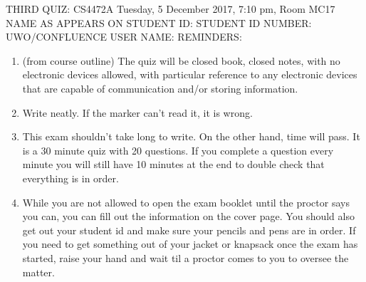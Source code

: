\documentclass{exam}
\begin{document}
THIRD QUIZ: CS4472A Tuesday, 5 December 2017, 7:10 pm, Room MC17\newline
\newline
\newline
\newline
NAME AS APPEARS ON STUDENT ID:\newline
\newline
STUDENT ID NUMBER:\newline
\newline
UWO/CONFLUENCE USER NAME:\newline
\newline
REMINDERS:
\begin{enumerate}
\item (from course outline) The quiz will be closed book, closed notes, with no electronic devices allowed, with particular reference to any electronic devices that are capable of communication and/or storing information.
\item Write neatly.  If the marker can't read it, it is wrong.
\item This exam shouldn't take long to write.  On the other hand, time will pass.  It is a 30 minute quiz with 20 questions.  If you complete a question every  minute you will still have 10 minutes at the end to double check that everything is in order.
\item While you are not allowed to open the exam booklet until the proctor says you can, you can fill out the information on the cover page.  You should also get out your student id and make sure your pencils and pens are in order.  If you need to get something out of your jacket or knapsack once the exam has started, raise your hand and wait til a proctor comes to you to oversee the matter.
\end{enumerate}
\newpage
\end{document}

